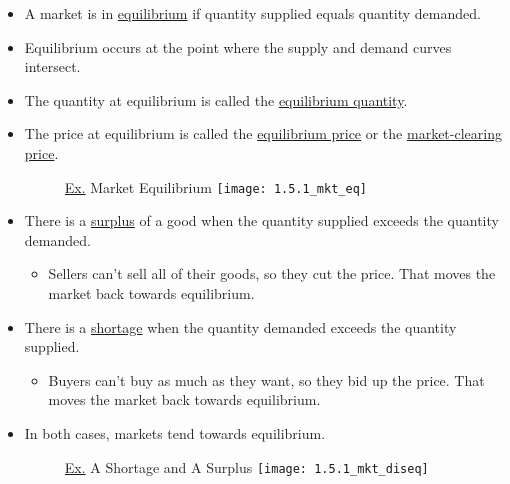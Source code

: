 	\begin{itemize}

	\item A market is in \underline{equilibrium} if quantity supplied equals quantity demanded.
		
	\item Equilibrium occurs at the point where the supply and demand curves intersect.
	
	\item The quantity at equilibrium is called the \underline{equilibrium quantity}.
	
	\item The price at equilibrium is called the \underline{equilibrium price} or the \underline{market-clearing price}.
	
	\begin{figure}[h]
	\underline{Ex.} Market Equilibrium
	\centering
	\texttt{[image: 1.5.1\_mkt\_eq]}
	\end{figure}
	
	\item There is a \underline{surplus} of a good when the quantity supplied exceeds the quantity demanded.
	
		\begin{itemize}
		
		\item Sellers can't sell all of their goods, so they cut the price. That moves the market back towards equilibrium.
		
		\end{itemize}
		
	\item There is a \underline{shortage} when the quantity demanded exceeds the quantity supplied.
	
		\begin{itemize}
		
		\item Buyers can't buy as much as they want, so they bid up the price. That moves the market back towards equilibrium. 
		
		\end{itemize}
		
	\item In both cases, markets tend towards equilibrium.
		
	\begin{figure}[h]
	\underline{Ex.} A Shortage and A Surplus
	\centering
	\texttt{[image: 1.5.1\_mkt\_diseq]}
	\end{figure}
	
	\end{itemize}
	
